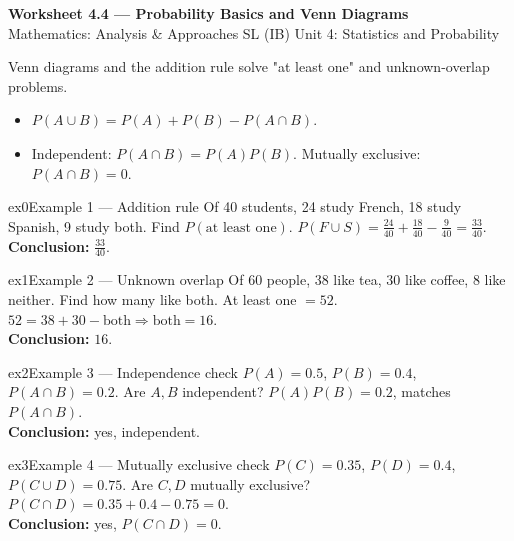 \documentclass[11pt]{article}
\begin{document}
\begin{center}
{\LARGE\bfseries\color{titleblue}Worksheet 4.4 --- Probability Basics and Venn Diagrams}\\[2pt]
{\small Mathematics: Analysis \& Approaches SL (IB) \textperiodcentered{} Unit 4: Statistics and Probability}
\end{center}

\begin{ideabox}
Venn diagrams and the addition rule solve "at least one" and unknown-overlap problems.
\begin{itemize}[leftmargin=*,itemsep=2pt]
  \item $P(A\cup B)=P(A)+P(B)-P(A\cap B)$.
  \item Independent: $P(A\cap B)=P(A)P(B)$. Mutually exclusive: $P(A\cap B)=0$.
\end{itemize}
\end{ideabox}


\begin{example}{ex0}{Example 1 --- Addition rule}
Of 40 students, 24 study French, 18 study Spanish, 9 study both. Find $P(\text{at least one})$.\soln
$P(F\cup S)=\tfrac{24}{40}+\tfrac{18}{40}-\tfrac{9}{40}=\tfrac{33}{40}$.\\[3pt]\textbf{Conclusion:} $\tfrac{33}{40}$.
\end{example}

\begin{example}{ex1}{Example 2 --- Unknown overlap}
Of 60 people, 38 like tea, 30 like coffee, 8 like neither. Find how many like both.\soln
At least one $=52$. $52=38+30-\text{both}\Rightarrow\text{both}=16$.\\[3pt]\textbf{Conclusion:} $16$.
\end{example}

\begin{example}{ex2}{Example 3 --- Independence check}
$P(A)=0.5$, $P(B)=0.4$, $P(A\cap B)=0.2$. Are $A,B$ independent?\soln
$P(A)P(B)=0.2$, matches $P(A\cap B)$.\\[3pt]\textbf{Conclusion:} yes, independent.
\end{example}

\begin{example}{ex3}{Example 4 --- Mutually exclusive check}
$P(C)=0.35$, $P(D)=0.4$, $P(C\cup D)=0.75$. Are $C,D$ mutually exclusive?\soln
$P(C\cap D)=0.35+0.4-0.75=0$.\\[3pt]\textbf{Conclusion:} yes, $P(C\cap D)=0$.
\end{example}
\end{document}
